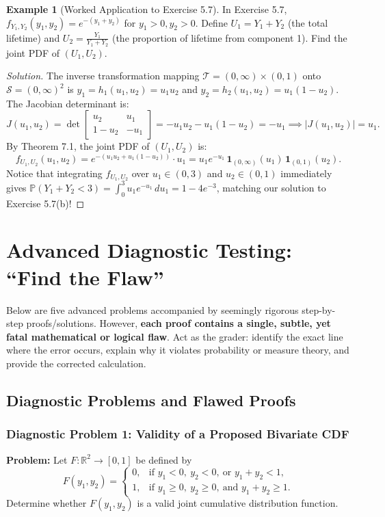 \documentclass[11pt, letterpaper]{article}
\theoremstyle{definition}
\newtheorem{example}{Example}[section]
\theoremstyle{remark}
\begin{document}
\begin{example}[Worked Application to Exercise 5.7]
In Exercise 5.7, $f_{Y_1, Y_2}(y_1, y_2) = e^{-(y_1 + y_2)}$ for $y_1 > 0, y_2 > 0$. Define $U_1 = Y_1 + Y_2$ (the total lifetime) and $U_2 = \frac{Y_1}{Y_1 + Y_2}$ (the proportion of lifetime from component 1). Find the joint PDF of $(U_1, U_2)$.
\end{example}

\begin{proof}[Solution]
The inverse transformation mapping $\mathcal{T} = (0, \infty) \times (0, 1)$ onto $\mathcal{S} = (0, \infty)^2$ is $y_1 = h_1(u_1, u_2) = u_1 u_2$ and $y_2 = h_2(u_1, u_2) = u_1(1 - u_2)$. The Jacobian determinant is:
\[
    J(u_1, u_2) = \det \begin{bmatrix} u_2 & u_1 \\ 1 - u_2 & -u_1 \end{bmatrix} = -u_1 u_2 - u_1(1 - u_2) = -u_1 \implies |J(u_1, u_2)| = u_1.
\]
By Theorem 7.1, the joint PDF of $(U_1, U_2)$ is:
\[
    f_{U_1, U_2}(u_1, u_2) = e^{-(u_1 u_2 + u_1(1 - u_2))} \cdot u_1 = u_1 e^{-u_1} \, \mathbf{1}_{(0, \infty)}(u_1) \, \mathbf{1}_{(0, 1)}(u_2).
\]
Notice that integrating $f_{U_1, U_2}$ over $u_1 \in (0, 3)$ and $u_2 \in (0, 1)$ immediately gives $\mathbb{P}(Y_1 + Y_2 < 3) = \int_0^3 u_1 e^{-u_1}\,du_1 = 1 - 4e^{-3}$, matching our solution to Exercise 5.7(b)!
\end{proof}

\newpage

\section{Advanced Diagnostic Testing: ``Find the Flaw''}

Below are five advanced problems accompanied by seemingly rigorous step-by-step proofs/solutions. However, \textbf{each proof contains a single, subtle, yet fatal mathematical or logical flaw}. Act as the grader: identify the exact line where the error occurs, explain why it violates probability or measure theory, and provide the corrected calculation.

\subsection{Diagnostic Problems and Flawed Proofs}

\subsubsection*{Diagnostic Problem 1: Validity of a Proposed Bivariate CDF}
\textbf{Problem:} Let $F : \mathbb{R}^2 \to [0, 1]$ be defined by
\[
    F(y_1, y_2) = \begin{cases}
        0, & \text{if } y_1 < 0,\ y_2 < 0,\ \text{or } y_1 + y_2 < 1, \\
        1, & \text{if } y_1 \ge 0,\ y_2 \ge 0,\ \text{and } y_1 + y_2 \ge 1.
    \end{cases}
\]
Determine whether $F(y_1, y_2)$ is a valid joint cumulative distribution function.
\end{document}
